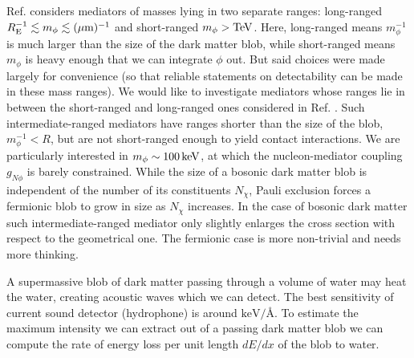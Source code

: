 \documentclass[%
 reprint,
 amsmath,amssymb,
 aps,nofootinbib
]{revtex4-1}
\newcommand{\keV}{\mathinner{\mathrm{keV}}}
\newcommand{\TeV}{\mathinner{\mathrm{TeV}}}
\begin{document}
Ref. \cite{Grabowska:2018lnd} considers mediators of masses lying in two separate ranges: long-ranged $R_{\rm E}^{-1}\lesssim m_\phi\lesssim (\mu\text{m})^{-1}$ and short-ranged $m_\phi>\TeV$. Here, long-ranged means $m_\phi^{-1}$ is much larger than the size of the dark matter blob, while short-ranged means $m_\phi$ is heavy enough that we can integrate $\phi$ out. But said choices were made largely for convenience (so that reliable statements on detectability can be made in these mass ranges). We would like to investigate mediators whose ranges lie in between the short-ranged and long-ranged ones considered in Ref. \cite{Grabowska:2018lnd}. Such intermediate-ranged mediators have ranges shorter than the size of the blob, $m_\phi^{-1}<R$, but are not short-ranged enough to yield contact interactions. We are particularly interested in $m_\phi\sim 100\keV$, at which the nucleon-mediator coupling $g_{N\phi}$ is barely constrained. While the size of a bosonic dark matter blob is independent of the number of its constituents $N_\chi$, Pauli exclusion forces a fermionic blob to grow in size as $N_\chi$ increases. In the case of bosonic dark matter such intermediate-ranged mediator only slightly enlarges the cross section with respect to the geometrical one. The fermionic case is more non-trivial and needs more thinking.




A supermassive blob of dark matter passing through a volume of water may heat the water, creating acoustic waves which we can detect. The best sensitivity of current sound detector (hydrophone) is around $\text{keV/\AA}$. To estimate the maximum intensity we can extract out of a passing dark matter blob we can compute the rate of energy loss per unit length $dE/dx$ of the blob to water.
\end{document}
